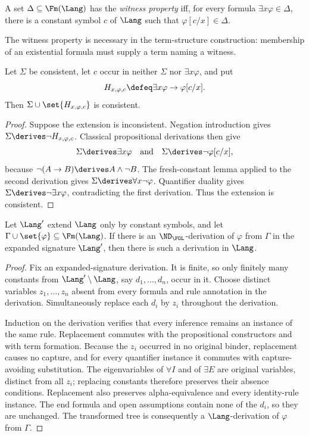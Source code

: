 \begin{definition}
A set \(\Delta\subseteq\Fm(\Lang)\) has the \emph{witness property} iff, for
every formula \(\exists x\varphi\in\Delta\), there is a constant symbol \(c\)
of \(\Lang\) such that \(\varphi[c/x]\in\Delta\).
\end{definition}

The witness property is necessary in the term-structure construction: membership
of an existential formula must supply a term naming a witness.

\begin{lemma}
\label{lem:witness-extension}
Let \(\Sigma\) be consistent, let \(c\) occur in neither \(\Sigma\) nor
\(\exists x\varphi\), and put
\[
 H_{x,\varphi,c}\defeq
 \exists x\varphi\to\varphi[c/x].
\]
Then \(\Sigma\cup\set{H_{x,\varphi,c}}\) is consistent.
\end{lemma}
\begin{proof}
Suppose the extension is inconsistent.  Negation introduction gives
\(\Sigma\derives\neg H_{x,\varphi,c}\).  Classical propositional derivations
then give
\[
 \Sigma\derives\exists x\varphi
 \quad\text{and}\quad
 \Sigma\derives\neg\varphi[c/x],
\]
because \(\neg(A\to B)\derives A\land\neg B\).  The fresh-constant lemma
applied to the second derivation gives
\(\Sigma\derives\forall x\neg\varphi\).  Quantifier duality gives
\(\Sigma\derives\neg\exists x\varphi\), contradicting the first derivation.
Thus the extension is consistent.
\end{proof}

\begin{lemma}
\label{lem:new-constant-elimination}
Let \(\Lang'\) extend \(\Lang\) only by constant symbols, and let
\(\Gamma\cup\set{\varphi}\subseteq\Fm(\Lang)\).  If there is an
\(\ND_{\FOL}\)-derivation of \(\varphi\) from \(\Gamma\) in the expanded
signature \(\Lang'\), then there is such a derivation in \(\Lang\).
\end{lemma}
\begin{proof}
Fix an expanded-signature derivation.  It is finite, so only finitely many
constants from \(\Lang'\setminus\Lang\), say
\(d_1,\ldots,d_n\), occur in it.  Choose distinct variables
\(z_1,\ldots,z_n\) absent from every formula and rule annotation in the
derivation.  Simultaneously replace each \(d_i\) by \(z_i\) throughout the
derivation.

Induction on the derivation verifies that every inference remains an instance
of the same rule.  Replacement commutes with the propositional constructors
and with term formation.  Because the \(z_i\) occurred in no original binder,
replacement causes no capture, and for every quantifier instance it commutes
with capture-avoiding substitution.  The eigenvariables of
\(\forall I\) and of \(\exists E\) are original variables,
distinct from all \(z_i\); replacing constants therefore preserves their
absence conditions.  Replacement also preserves alpha-equivalence and every
identity-rule instance.  The end formula and open assumptions contain none of
the \(d_i\), so they are unchanged.  The transformed tree is consequently a
\(\Lang\)-derivation of \(\varphi\) from \(\Gamma\).
\end{proof}

